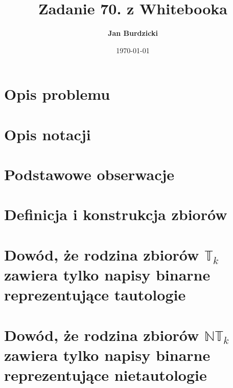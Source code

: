 \documentclass{article}
\title{\textbf{Zadanie 70. z Whitebooka}}
\author{\textbf{Jan Burdzicki}}
\affil{II UWr}
\date{\today}
\begin{document}
\maketitle

\vspace{50pt}

\renewcommand{\contentsname}{Spis treści}
\tableofcontents

\newpage

\section{Opis problemu}



\section{Opis notacji}



\section{Podstawowe obserwacje}




\section{Definicja i konstrukcja zbiorów}



\section{Dowód, że rodzina zbiorów $\mathbb{T}_k$ zawiera tylko napisy binarne reprezentujące tautologie}



\section{Dowód, że rodzina zbiorów $\mathbb{NT}_k$ zawiera tylko napisy binarne reprezentujące nietautologie}



\end{document}
